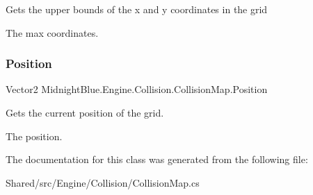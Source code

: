 Gets the upper bounds of the x and y coordinates in the grid 

The max coordinates.\hypertarget{class_midnight_blue_1_1_engine_1_1_collision_1_1_collision_map_a4221dbaa3fcdcd868a8fb6e9eccbd924}{}\label{class_midnight_blue_1_1_engine_1_1_collision_1_1_collision_map_a4221dbaa3fcdcd868a8fb6e9eccbd924} 
\subsubsection{\texorpdfstring{Position}{Position}}
{\footnotesize\ttfamily Vector2 Midnight\+Blue.\+Engine.\+Collision.\+Collision\+Map.\+Position\hspace{0.3cm}{\ttfamily [get]}}



Gets the current position of the grid. 

The position.

The documentation for this class was generated from the following file\+:\begin{DoxyCompactItemize}
\item 
Shared/src/\+Engine/\+Collision/Collision\+Map.\+cs\end{DoxyCompactItemize}
